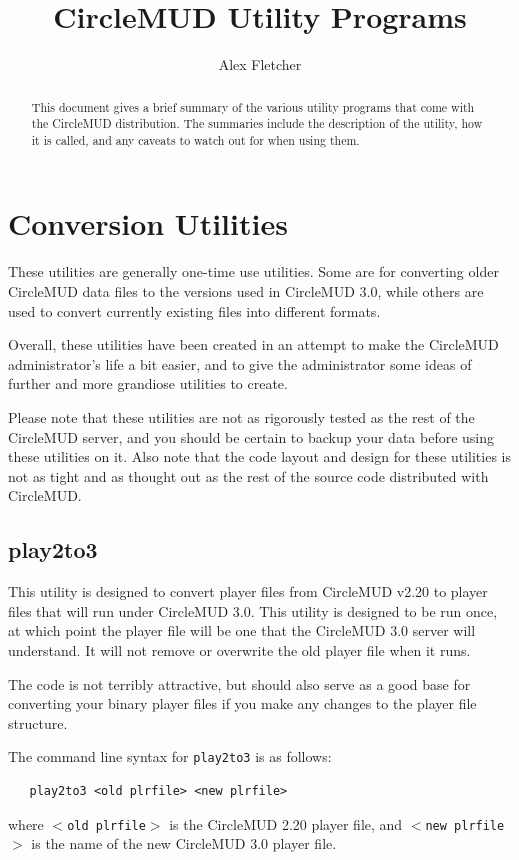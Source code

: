 \documentclass[11pt]{article}
\title{CircleMUD Utility Programs}
\author{Alex Fletcher}
\begin{document}
\maketitle

\begin{abstract}
This document gives a brief summary of the various utility programs that come with the CircleMUD distribution.  The summaries include the description of the utility, how it is called, and any caveats to watch out for when using them.
\end{abstract}

\tableofcontents

\section{Conversion Utilities}
These utilities are generally one-time use utilities.  Some are for converting older CircleMUD data files to the versions used in CircleMUD 3.0, while others are used to convert currently existing files into different formats.
\par
Overall, these utilities have been created in an attempt to make the CircleMUD administrator's life a bit easier, and to give the administrator some ideas of further and more grandiose utilities to create.
\par
Please note that these utilities are not as rigorously tested as the rest of the CircleMUD server, and you should be certain to backup your data before using these utilities on it.  Also note that the code layout and design for these utilities is not as tight and as thought out as the rest of the source code distributed with CircleMUD.

\subsection{play2to3}
This utility is designed to convert player files from CircleMUD v2.20 to player files that will run under CircleMUD 3.0.  This utility is designed to be run once, at which point the player file will be one that the CircleMUD 3.0 server will understand.  It will not remove or overwrite the old player file when it runs.
\par
The code is not terribly attractive, but should also serve as a good base for converting your binary player files if you make any changes to the player file structure.
\par
The command line syntax for \texttt{play2to3} is as follows:
\begin{verbatim}
   play2to3 <old plrfile> <new plrfile>
\end{verbatim}
where \texttt{$<$old plrfile$>$} is the CircleMUD 2.20 player file, and \texttt{$<$new plrfile$>$} is the name of the new CircleMUD 3.0 player file.
\end{document}
